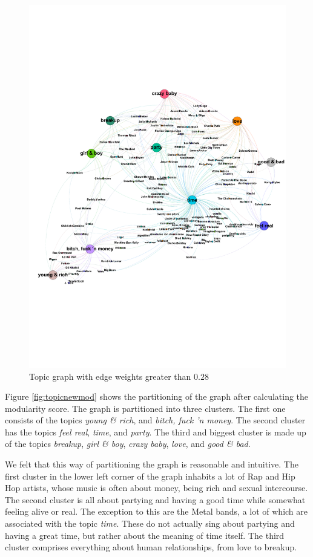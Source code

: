 \documentclass[10pt,a4paper]{article}
\begin{document}
		\begin{figure}[htb]
			\centering
			\includegraphics[trim=0mm 60mm 0mm 50mm, clip, width=\linewidth]{data/topic_graph}
			\caption{Topic graph with edge weights greater than $0.28$}
			\label{fig:topicgraph}
		\end{figure}
		
		Figure \ref{fig:topicnewmod} shows the partitioning of the graph after calculating the modularity score. The graph is partitioned into three clusters. The first one consists of the topics \textit{young \& rich}, and \textit{bitch, fuck 'n money}. The second cluster has the topics \textit{feel real}, \textit{time}, and \textit{party}. The third and biggest cluster is made up of the topics \textit{breakup}, \textit{girl \& boy}, \textit{crazy baby}, \textit{love}, and \textit{good \& bad}.
		
		We felt that this way of partitioning the graph is reasonable and intuitive. The first cluster in the lower left corner of the graph inhabits a lot of Rap and Hip Hop artists, whose music is often about money, being rich and sexual intercourse. The second cluster is all about partying and having a good time while somewhat feeling alive or real. The exception to this are the Metal bands, a lot of which are associated with the topic \textit{time}. These do not actually sing about partying and having a great time, but rather about the meaning of time itself. The third cluster comprises everything about human relationships, from love to breakup.
		
\end{document}
